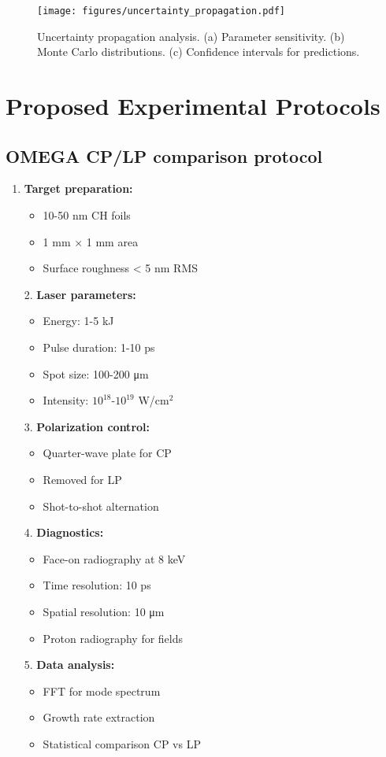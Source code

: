 \documentclass[aps,pre,twocolumn,superscriptaddress]{revtex4-2}
\begin{document}
\begin{figure}[h]
\texttt{[image: figures/uncertainty\_propagation.pdf]}
\caption{Uncertainty propagation analysis. (a) Parameter sensitivity. (b) Monte Carlo distributions. (c) Confidence intervals for predictions.}
\label{fig:uncertainty}
\end{figure}

\section{Proposed Experimental Protocols}

\subsection{OMEGA CP/LP comparison protocol}

\begin{enumerate}
\item \textbf{Target preparation:}
   \begin{itemize}
   \item 10-50 nm CH foils
   \item 1 mm × 1 mm area
   \item Surface roughness < 5 nm RMS
   \end{itemize}

2. \textbf{Laser parameters:}
   \begin{itemize}
   \item Energy: 1-5 kJ
   \item Pulse duration: 1-10 ps
   \item Spot size: 100-200 μm
   \item Intensity: $10^{18}$-$10^{19}$ W/cm$^2$
   \end{itemize}

3. \textbf{Polarization control:}
   \begin{itemize}
   \item Quarter-wave plate for CP
   \item Removed for LP
   \item Shot-to-shot alternation
   \end{itemize}

4. \textbf{Diagnostics:}
   \begin{itemize}
   \item Face-on radiography at 8 keV
   \item Time resolution: 10 ps
   \item Spatial resolution: 10 μm
   \item Proton radiography for fields
   \end{itemize}

5. \textbf{Data analysis:}
   \begin{itemize}
   \item FFT for mode spectrum
   \item Growth rate extraction
   \item Statistical comparison CP vs LP
   \end{itemize}
\end{enumerate}
\end{document}
